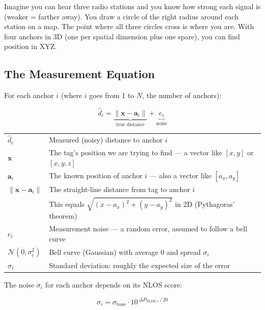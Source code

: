 \documentclass[11pt,a4paper]{article}
\newcommand{\vect}[1]{\bm{#1}}
\begin{document}
\begin{analogy}
Imagine you can hear three radio stations and you know how strong each signal is (weaker = farther away). You draw a circle of the right radius around each station on a map. The point where all three circles cross is where you are. With four anchors in 3D (one per spatial dimension plus one spare), you can find position in XYZ.
\end{analogy}

\subsection{The Measurement Equation}

For each anchor $i$ (where $i$ goes from 1 to $N$, the number of anchors):

\begin{equation}
\hat{d}_i = \underbrace{\|\vect{x} - \vect{a}_i\|}_{\text{true distance}} + \underbrace{e_i}_{\text{noise}}
\label{eq:measurement}
\end{equation}

\begin{symbols}
\begin{tabular}{ll}
$\hat{d}_i$ & Measured (noisy) distance to anchor $i$ \\
$\vect{x}$ & The tag's position we are trying to find --- a vector like $[x, y]$ or $[x, y, z]$ \\
$\vect{a}_i$ & The known position of anchor $i$ --- also a vector like $[a_x, a_y]$ \\
$\|\vect{x} - \vect{a}_i\|$ & The straight-line distance from tag to anchor $i$ \\
  & \quad This equals $\sqrt{(x-a_x)^2 + (y-a_y)^2}$ in 2D (Pythagoras' theorem) \\
$e_i$ & Measurement noise --- a random error, assumed to follow a bell curve \\
$\mathcal{N}(0,\sigma_i^2)$ & Bell curve (Gaussian) with average 0 and spread $\sigma_i$ \\
$\sigma_i$ & Standard deviation: roughly the expected size of the error \\
\end{tabular}
\end{symbols}

The noise $\sigma_i$ for each anchor depends on its NLOS score:

\begin{equation}
\sigma_i = \sigma_{\text{base}} \cdot 10^{\,\Delta P_{\text{NLOS},i}\,/\,20}
\label{eq:sigma}
\end{equation}
\end{document}

